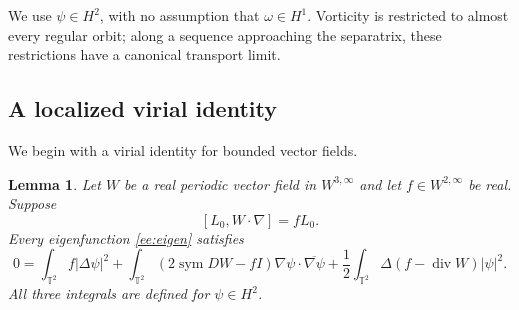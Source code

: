 \documentclass[reqno,11pt]{amsart}
\numberwithin{equation}{section}
\newtheorem{lemma}[theorem]{Lemma}
\theoremstyle{remark}
\begin{document}
We use $\psi\in H^2$, with no assumption that $\omega\in H^1$.
Vorticity is restricted to almost every regular orbit; along a
sequence approaching the separatrix, these restrictions have a
canonical transport limit.

\subsection{A localized virial identity}

We begin with a virial identity for bounded vector fields.

\begin{lemma}\label{ee:bounded-virial}
Let $W$ be a real periodic vector field in $W^{3,\infty}$ and let
$f\in W^{2,\infty}$ be real. Suppose
\[
 [L_0,W\cdot\nabla]=fL_0.
\]
Every eigenfunction \eqref{ee:eigen} satisfies
\begin{equation}\label{ee:bounded-form}
 0=\int_{\mathbb T^2} f|\Delta\psi|^2
   +\int_{\mathbb T^2}(2\operatorname{sym}DW-fI)
                  \nabla\psi\cdot\overline{\nabla\psi}
   +\frac12\int_{\mathbb T^2}\Delta(f-\operatorname{div}W)|\psi|^2.
\end{equation}
All three integrals are defined for $\psi\in H^2$.
\end{lemma}
\end{document}
